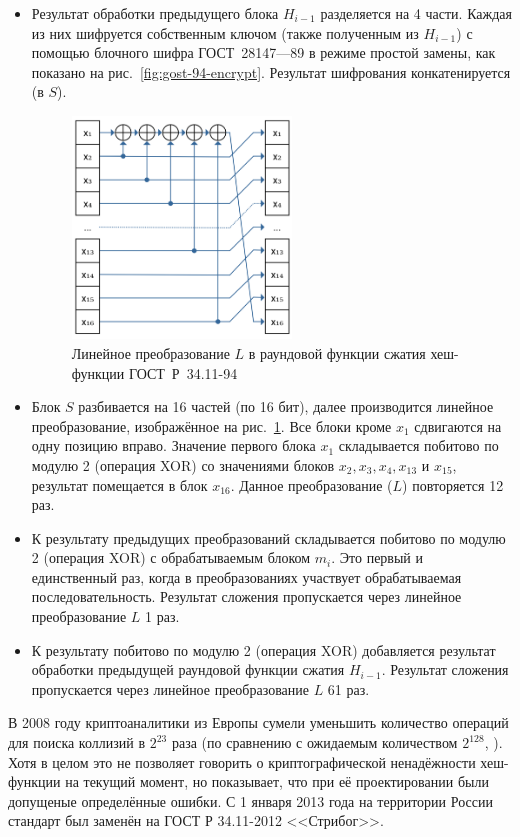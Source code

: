 \begin{itemize}
  \item Результат обработки предыдущего блока $H_{i-1}$ разделяется на 4 части.  Каждая из них шифруется собственным ключом (также полученным из $H_{i-1}$) с помощью блочного шифра ГОСТ~28147—89 в режиме простой замены, как показано на рис.~\ref{fig:gost-94-encrypt}. Результат шифрования конкатенируется (в $S$).

\begin{figure}[htb]
    \centering
    \includegraphics[width=0.55\textwidth]{pic/gost-94-permutation}
    \caption{Линейное преобразование $L$ в раундовой функции сжатия хеш-функции ГОСТ~Р~34.11-94}
    \label{fig:gost-94-permutation}
\end{figure}

  \item Блок $S$ разбивается на 16 частей (по 16 бит), далее производится линейное преобразование, изображённое на рис.~\ref{fig:gost-94-permutation}. Все блоки кроме $x_1$ сдвигаются на одну позицию вправо. Значение первого блока $x_1$ складывается побитово по модулю 2 (операция XOR) со значениями блоков $x_2, x_3, x_4, x_13$ и $x_15$, результат помещается в блок $x_16$. Данное преобразование ($L$) повторяется 12 раз. 
  \item К результату предыдущих преобразований складывается побитово по модулю 2 (операция XOR) с обрабатываемым блоком $m_i$. Это первый и единственный раз, когда в преобразованиях участвует обрабатываемая последовательность. Результат сложения пропускается через линейное преобразование $L$ 1 раз.
  \item К результату побитово по модулю 2 (операция XOR) добавляется результат обработки предыдущей раундовой функции сжатия $H_{i-1}$. Результат сложения пропускается через линейное преобразование $L$ 61 раз.
\end{itemize}

В 2008 году криптоаналитики из Европы сумели уменьшить количество операций для поиска коллизий в $2^{23}$ раза (по сравнению с ожидаемым количеством $2^{128}$, \cite{Boldyreva:Fehr:ONeill:2008}). Хотя в целом это не позволяет говорить о криптографической ненадёжности хеш-функции на текущий момент, но показывает, что при её проектировании были допущеные определённые ошибки. С 1 января 2013 года на территории России стандарт был заменён на ГОСТ Р 34.11-2012 <<Стрибог>>.

